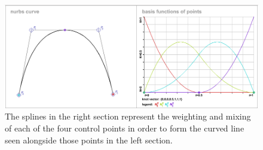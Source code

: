 \begin{figure}  
\includegraphics[width=\textwidth]{figures/systemDesign/urbsDemo.png}
\caption[3rd order (Quadratic) URBS curve and corresponding basis splines]{The splines in the right section represent the weighting and mixing of each of the four control points in order to form the curved line seen alongside those points in the left section.\cite{website:nurbsDemo}} 
\label{fig:urbsDemo}
\end{figure}
